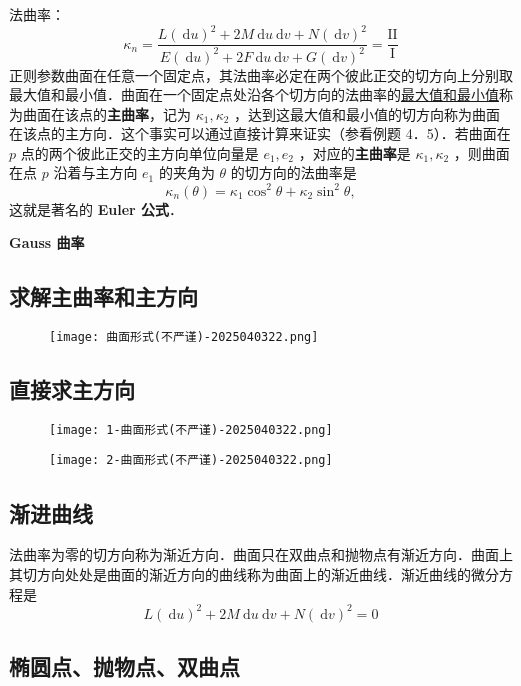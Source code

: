法曲率：
\[
\kappa_n=\frac{L(\mathrm{~d} u)^2+2 M \mathrm{~d} u \mathrm{~d} v+N(\mathrm{~d} v)^2}{E(\mathrm{~d} u)^2+2 F \mathrm{~d} u \mathrm{~d} v+G(\mathrm{~d} v)^2}=\frac{\mathrm{II}}{\mathrm{I}}
\]
正则参数曲面在任意一个固定点，其法曲率必定在两个彼此正交的切方向上分别取最大值和最小值．曲面在一个固定点处沿各个切方向的法曲率的\underline{最大值和最小值}称为曲面在该点的\textbf{主曲率}，记为 $\kappa_1, \kappa_2$ ，达到这最大值和最小值的切方向称为曲面在该点的主方向．这个事实可以通过直接计算来证实（参看例题 4．5）．若曲面在 $p$ 点的两个彼此正交的主方向单位向量是 $e_1, e_2$ ，对应的\textbf{主曲率}是 $\kappa_1, \kappa_2$ ，则曲面在点 $p$ 沿着与主方向 $e_1$ 的夹角为 $\theta$ 的切方向的法曲率是
\[
\kappa_n(\theta)=\kappa_1 \cos ^2 \theta+\kappa_2 \sin ^2 \theta,
\]
这就是著名的 \textbf{Euler 公式}．

\textbf{Gauss 曲率}


\subsection{求解主曲率和主方向}

\begin{figure}[H]
\centering
\texttt{[image: 曲面形式(不严谨)-2025040322.png]}
\label{}
\end{figure}

\subsection{直接求主方向}

\begin{figure}[H]
\centering
\texttt{[image: 1-曲面形式(不严谨)-2025040322.png]}
\label{}
\end{figure}

\begin{figure}[H]
\centering
\texttt{[image: 2-曲面形式(不严谨)-2025040322.png]}
\label{}
\end{figure}

\subsection{渐进曲线}

法曲率为零的切方向称为渐近方向．曲面只在双曲点和抛物点有渐近方向．曲面上其切方向处处是曲面的渐近方向的曲线称为曲面上的渐近曲线．渐近曲线的微分方程是
\[
L(\mathrm{~d} u)^2+2 M \mathrm{~d} u \mathrm{~d} v+N(\mathrm{~d} v)^2=0
\]
\subsection{椭圆点、抛物点、双曲点}

